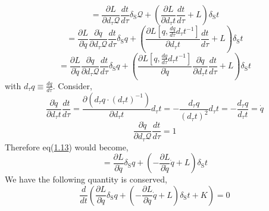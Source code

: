\documentclass[12pt]{article}
\numberwithin{equation}{section}
\begin{document}
\[ = \frac{\partial L}{\partial d_{\tau}\mathcal{Q}}\frac{dt}{d\tau}\delta_{\text{S}}\mathcal{Q}+\left(\frac{\partial L}{\partial d_{\tau}t}\frac{dt}{d\tau}+L\right)\delta_{\text{S}}t\]
\[ = \frac{\partial L}{\partial \dot{q}}\frac{\partial\dot{q}}{\partial d_{\tau}\mathcal{Q}}\frac{dt}{d\tau}\delta_{\text{S}}q+\left(\frac{\partial L\left[q,\frac{dq}{d\tau}d_{\tau}t^{-1}\right]}{\partial d_{\tau}t}\frac{dt}{d\tau}+L\right)\delta_{\text{S}}t\]
\begin{equation}
    = \frac{\partial L}{\partial \dot{q}}\frac{\partial\dot{q}}{\partial d_{\tau}\mathcal{Q}}\frac{dt}{d\tau}\delta_{\text{S}}q+\left(\frac{\partial L\left[q,\frac{dq}{d\tau}d_{\tau}t^{-1}\right]}{\partial \dot{q}}\frac{\partial\dot{q}}{\partial d_{\tau}t}\frac{dt}{d\tau}+L\right)\delta_{\text{S}}t
\end{equation}\label{1.13}
with $d_{\tau}q\equiv \frac{dq}{d\tau}$. Consider,
\[\frac{\partial\dot{q}}{\partial d_{\tau}t}\frac{dt}{d\tau}=\frac{\partial\left(d_{\tau}q\cdot(d_{\tau}t)^{-1}\right)}{\partial d_{\tau}t}d_{\tau}t = -\frac{d_{\tau}q}{(d_{\tau}t)^2}d_{\tau}t = -\frac{d_{\tau}q}{d_{\tau}t} = \dot{q}\]
\[\frac{\partial \dot{q}}{\partial d_{\tau}\mathcal{Q}}\frac{dt}{d\tau} = 1\]
Therefore eq(\hyperref[1.13]{1.13}) would become,
\[ = \frac{\partial L}{\partial \dot{q}}\delta_{\text{S}}q+\left(-\frac{\partial L}{\partial \dot{q}}\dot{q}+L\right)\delta_{\text{S}}t\]
We have the following quantity is conserved,
\begin{equation}
    \frac{d}{dt}\left(\frac{\partial L}{\partial \dot{q}}\delta_{\text{S}}q+\left(-\frac{\partial L}{\partial \dot{q}}\dot{q}+L\right)\delta_{\text{S}}t+K\right) = 0
\end{equation}
\end{document}
